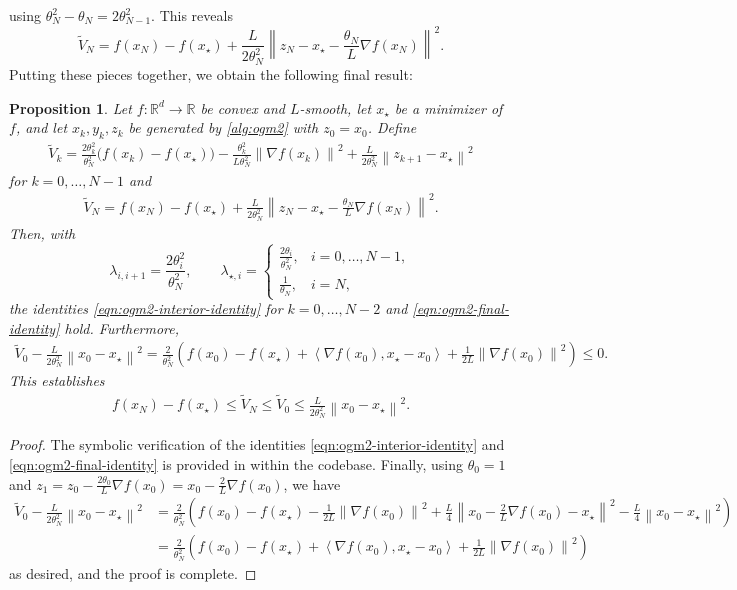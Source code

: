 \documentclass{article}
\theoremstyle{definition}
\theoremstyle{plain}
\newtheorem{proposition}{Proposition}
\newcommand{\reals}{\mathbb{R}}
\newcommand{\inprod}[2]{\left\langle #1,#2 \right\rangle}
\newcommand{\sqnorm}[1]{\left\| #1 \right\|^2}
\begin{document}
using $\theta_N^2-\theta_N=2\theta_{N-1}^2$. This reveals
\[
    \widetilde V_N
    =
    f(x_N)-f(x_\star)
    +\frac{L}{2\theta_N^2}
    \sqnorm{z_N-x_\star-\frac{\theta_N}{L}\nabla f(x_N)} .
\]
Putting these pieces together, we obtain the following final result:
\begin{proposition}
\label{proposition:ogm2}
Let $f\colon\reals^d\to\reals$ be convex and $L$-smooth, let $x_\star$ be a minimizer of $f$, and let $x_k,y_k,z_k$ be generated by \eqref{alg:ogm2} with $z_0=x_0$.
Define
\begin{align*}
    \widetilde V_k
    =
    \frac{2\theta_k^2}{\theta_N^2}\bigl(f(x_k)-f(x_\star)\bigr)
    -\frac{\theta_k^2}{L\theta_N^2}\sqnorm{\nabla f(x_k)}
    +\frac{L}{2\theta_N^2}\sqnorm{z_{k+1}-x_\star}
\end{align*}
for $k=0,\dots,N-1$ and 
\begin{align*}
    \widetilde V_N
    =
    f(x_N)-f(x_\star)
    +\frac{L}{2\theta_N^2}
    \sqnorm{z_N-x_\star-\frac{\theta_N}{L}\nabla f(x_N)} .
\end{align*}
Then, with
\[
    \lambda_{i,i+1}
    =
    \frac{2\theta_i^2}{\theta_N^2},
    \qquad
    \lambda_{\star,i}
    =
    \begin{cases}
        \frac{2\theta_i}{\theta_N^2}, & i=0,\dots,N-1,\\[2mm]
        \frac{1}{\theta_N}, & i=N ,
    \end{cases}
\]
the identities \eqref{eqn:ogm2-interior-identity} for $k=0,\dots,N-2$ and \eqref{eqn:ogm2-final-identity} hold.
Furthermore,
\begin{align*}
    \widetilde V_0-\frac{L}{2\theta_N^2}\sqnorm{x_0-x_\star}
    =
    \frac{2}{\theta_N^2}
    \left(
        f(x_0)-f(x_\star)
        +\inprod{\nabla f(x_0)}{x_\star-x_0}
        +\frac{1}{2L}\sqnorm{\nabla f(x_0)}
    \right) 
    \le 0 .
\end{align*}
This establishes
\begin{align*}
    f(x_N) - f(x_\star) \le \widetilde V_N \le \widetilde V_0 \le \frac{L}{2\theta_N^2}\sqnorm{x_0-x_\star} .
\end{align*}
\end{proposition}

\begin{proof}
The symbolic verification of the identities \eqref{eqn:ogm2-interior-identity} and \eqref{eqn:ogm2-final-identity} is provided in 
 within the codebase.
Finally, using $\theta_0 = 1$ and $z_1 = z_0 - \frac{2\theta_0}{L} \nabla f(x_0) = x_0 - \frac{2}{L} \nabla f(x_0)$, we have
\begin{align*}
    \widetilde V_0 -\frac{L}{2\theta_N^2}\sqnorm{x_0-x_\star} & = 
    \frac{2}{\theta_N^2} \left( f(x_0) - f(x_\star) - \frac{1}{2L} \sqnorm{\nabla f(x_0)} + \frac{L}{4} \sqnorm{x_0 - \frac{2}{L} \nabla f(x_0) - x_\star} - \frac{L}{4} \sqnorm{x_0 - x_\star} \right) \\
    & = \frac{2}{\theta_N^2} \left( f(x_0)-f(x_\star)
    +\inprod{\nabla f(x_0)}{x_\star-x_0}
    +\frac{1}{2L}\sqnorm{\nabla f(x_0)} \right) 
\end{align*}
as desired, and the proof is complete.
\end{proof}
\end{document}
